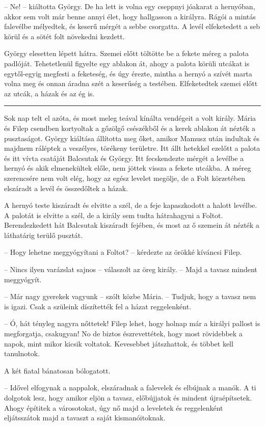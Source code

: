 \documentclass[10pt]{memoir}
\renewcommand{\pfbreakdisplay}{\bigskip \ding{166} \bigskip}
\newcommand{\secbreak}{\fancybreak{\pfbreakdisplay}\indent}
\begin{document}
-- Ne! -- kiáltotta György. De ha lett is volna egy cseppnyi jóakarat a
hernyóban, akkor sem volt már benne annyi élet, hogy hallgasson a királyra.
Rágói a mintás falevélbe mélyedtek, és keserű mérgét a sebbe csorgatta. A levél
elfeketedett a seb körül és a sötét folt növekedni kezdett.

György elesetten lépett hátra. Szemei előtt töltötte be a fekete méreg a palota
padlóját. Tehetetlenül figyelte egy ablakon át, ahogy a palota körüli utcákat
is egytől-egyig megfesti a feketeség, és úgy érezte, mintha a hernyó a szívét
marta volna meg és onnan áradna szét a keserűség a testében. Elfeketedtek
szemei előtt az utcák, a házak és az ég is.

\secbreak

Sok nap telt el azóta, és most meleg teával kínálta vendégeit a volt király.
Mária és Filep csendben kortyoltak a gőzölgő csészékből és a kerek ablakon át
nézték a pusztaságot. György kiáltása állította meg őket, amikor Mamusz után
indultak és majdnem ráléptek a veszélyes, törékeny területre. Itt állt hetekkel
ezelőtt a palota és itt vívta csatáját Balcsutak és György. Itt fecskendezte
mérgét a levélbe a hernyó és akik elmenekültek előle, nem jöttek vissza a
fekete utcákba. A méreg szerencsére nem volt elég, hogy az egész levelet
megölje, de a Folt körzetében elszáradt a levél és összedőltek a házak.

A hernyó teste kiszáradt és elvitte a szél, de a feje kapaszkodott a halott
levélbe. A palotát is elvitte a szél, de a király sem tudta hátrahagyni a
Foltot. Berendezkedett hát Balcsutak kiszáradt fejében, és most az ő szemein át
nézték a láthatárig terülő pusztát.

-- Hogy lehetne meggyógyítani a Foltot? -- kérdezte az örökké kíváncsi Filep.

-- Nincs ilyen varázslat sajnos -- válaszolt az öreg király. -- Majd a
tavasz mindent meggyógyít.

-- Már nagy gyerekek vagyunk -- szólt közbe Mária. -- Tudjuk, hogy a tavasz
nem is igazi. Csak a szüleink díszítették fel a házat reggelenként.

-- Ó, hát tényleg nagyra nőttetek! Filep lehet, hogy holnap már a királyi
pallost is megforgatja, csakugyan! No de biztos észrevettétek, hogy most
rövidebbek a napok, mint mikor kicsik voltatok. Kevesebbet játszhattok, és
többet kell tanulnotok.

A két fiatal bánatosan bólogatott.

-- Idővel elfogynak a nappalok, elszáradnak a falevelek és elbújnak a manók. A
ti dolgotok lesz, hogy amikor eljön a tavasz, előbújjatok és mindent
újraépítsetek. Ahogy építitek a városotokat, úgy nő majd a leveletek és
reggelenként eljátsszátok majd a tavaszt a saját kismanóitoknak.
\end{document}
